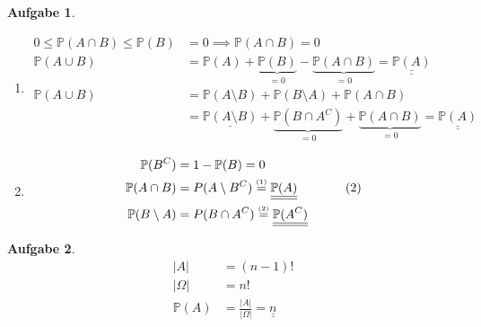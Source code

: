 \documentclass[11pt]{article}
\theoremstyle{break}
\newtheorem{task}{Aufgabe}
\begin{document}
\setcounter{task}{2}
\begin{task}
\hfill\vspace{-5mm}
\begin{enumerate}[label={(\alph*)}]
\item \hfill\vspace{-8mm}
\begin{align*}
0\leq \mathbb{P}(A\cap B) \leq \mathbb{P}(B) &= 0 \implies \mathbb{P}(A\cap B) = 0&\\
\mathbb{P}(A\cup B) &= \mathbb{P}(A) + \underbrace{\mathbb{P}(B)}_{=0} - \underbrace{\mathbb{P}(A\cap B)}_{=0} = \underline{\underline{\mathbb{P}(A)}}&\\
\mathbb{P}(A\cup B) &= \mathbb{P}(A\setminus B) + \mathbb{P}(B\setminus A) + \mathbb{P}(A\cap B)&\\
&= \underline{\mathbb{P}(A\setminus B)} + \underbrace{\mathbb{P}(B\cap A^C)}_{=0} + \underbrace{\mathbb{P}(A\cap B)}_{=0} = \underline{\underline{\mathbb{P}(A)}}&\tag{1}
\end{align*}
\item \hfill\vspace{-8mm}
\begin{align*}
    \mathbb{P}(B^C)&=1-\mathbb{P}(B)=0&\\
    \mathbb{P}(A\cap B)&=P(A\setminus B^C) \stackrel{\mbox{\tiny (1)}}{=} \underline{\underline{\mathbb{P}(A)}}&\tag{2}\\
    \mathbb{P}(B\setminus A)&=P(B\cap A^C) \stackrel{\mbox{\tiny (2)}}{=} \underline{\underline{\mathbb{P}(A^C)}}
\end{align*}
\end{enumerate}
\end{task}

\setcounter{task}{4}
\begin{task}
     \hfill\vspace{-8mm}
    \begin{align*}
        \left\vert A \right\vert &= (n-1)! \\
        \left\vert \Omega \right\vert &= n! \\
        \mathbb{P}(A) &= \frac{\left\vert A \right\vert}{\left\vert \Omega \right\vert} = \underline{\underline{n}} 
    \end{align*}
\end{task}
\end{document}
